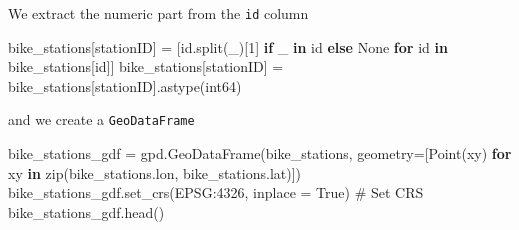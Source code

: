 \documentclass[
  letterpaper,
  DIV=11,
  numbers=noendperiod]{scrreprt}
\newenvironment{Shaded}{\begin{snugshade}}{\end{snugshade}}
\newcommand{\BuiltInTok}[1]{\textcolor[rgb]{0.00,0.23,0.31}{#1}}
\newcommand{\CommentTok}[1]{\textcolor[rgb]{0.37,0.37,0.37}{#1}}
\newcommand{\ControlFlowTok}[1]{\textcolor[rgb]{0.00,0.23,0.31}{\textbf{#1}}}
\newcommand{\DecValTok}[1]{\textcolor[rgb]{0.68,0.00,0.00}{#1}}
\newcommand{\KeywordTok}[1]{\textcolor[rgb]{0.00,0.23,0.31}{\textbf{#1}}}
\newcommand{\NormalTok}[1]{\textcolor[rgb]{0.00,0.23,0.31}{#1}}
\newcommand{\OperatorTok}[1]{\textcolor[rgb]{0.37,0.37,0.37}{#1}}
\newcommand{\StringTok}[1]{\textcolor[rgb]{0.13,0.47,0.30}{#1}}
\newcommand{\VariableTok}[1]{\textcolor[rgb]{0.07,0.07,0.07}{#1}}
\begin{document}
We extract the numeric part from the \texttt{id} column

\begin{Shaded}
\begin{Highlighting}[]
\NormalTok{bike\_stations[}\StringTok{\textquotesingle{}stationID\textquotesingle{}}\NormalTok{] }\OperatorTok{=}\NormalTok{ [}\BuiltInTok{id}\NormalTok{.split(}\StringTok{\textquotesingle{}\_\textquotesingle{}}\NormalTok{)[}\DecValTok{1}\NormalTok{] }\ControlFlowTok{if} \StringTok{\textquotesingle{}\_\textquotesingle{}} \KeywordTok{in} \BuiltInTok{id} \ControlFlowTok{else} \VariableTok{None} \ControlFlowTok{for} \BuiltInTok{id} \KeywordTok{in}\NormalTok{ bike\_stations[}\StringTok{\textquotesingle{}id\textquotesingle{}}\NormalTok{]]}
\NormalTok{bike\_stations[}\StringTok{\textquotesingle{}stationID\textquotesingle{}}\NormalTok{] }\OperatorTok{=}\NormalTok{ bike\_stations[}\StringTok{\textquotesingle{}stationID\textquotesingle{}}\NormalTok{].astype(}\StringTok{\textquotesingle{}int64\textquotesingle{}}\NormalTok{)}
\end{Highlighting}
\end{Shaded}

and we create a \texttt{GeoDataFrame}

\begin{Shaded}
\begin{Highlighting}[]
\NormalTok{bike\_stations\_gdf }\OperatorTok{=}\NormalTok{ gpd.GeoDataFrame(bike\_stations, geometry}\OperatorTok{=}\NormalTok{[Point(xy) }\ControlFlowTok{for}\NormalTok{ xy }\KeywordTok{in} \BuiltInTok{zip}\NormalTok{(bike\_stations.lon, bike\_stations.lat)])}
\NormalTok{bike\_stations\_gdf.set\_crs(}\StringTok{\textquotesingle{}EPSG:4326\textquotesingle{}}\NormalTok{, inplace }\OperatorTok{=} \VariableTok{True}\NormalTok{)  }\CommentTok{\# Set CRS}
\NormalTok{bike\_stations\_gdf.head()}
\end{Highlighting}
\end{Shaded}
\end{document}
